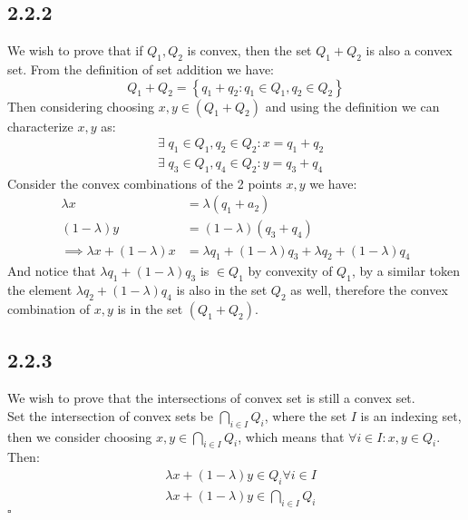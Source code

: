 \documentclass[]{article}
\begin{document}
    \subsection*{2.2.2}
        We wish to prove that if $Q_1, Q_2$ is convex, then the set $Q_1 + Q_2$ is also a convex set. From the definition of set addition we have: 
        $$
            Q_1 + Q_2 = \left\lbrace
                q_1 + q_2: q_1 \in Q_1, q_2 \in Q_2
            \right\rbrace
        $$
        Then considering choosing $x, y \in (Q_1 + Q_2)$ and using the definition we can characterize $x, y$ as: 
        \begin{align*}\tag{2.2.2.1}\label{eqn:2.2.2.1}
            & \exists\; q_1 \in Q_1, q_2 \in Q_2 : x = q_1 + q_2
            \\
            & \exists\; q_3 \in Q_1, q_4 \in Q_2 : y = q_3 + q_4
        \end{align*}
        Consider the convex combinations of the 2 points $x, y$ we have: 
        \begin{align*}\tag{2.2.2.2}\label{eqn:2.2.2.2}
            \lambda x &= \lambda(q_1 + a_2)
            \\
            (1 - \lambda) y &= (1 - \lambda)(q_3 + q_4)
            \\\implies
            \lambda x + (1 - \lambda)x &= \lambda q_1 + (1 - \lambda)q_3 + 
            \lambda q_2 + (1 - \lambda)q_4
        \end{align*}
        And notice that $\lambda q_1 + (1 - \lambda)q_3$ is $\in Q_1$ by convexity of $Q_1$, by a similar token the element $\lambda q_2 + (1 - \lambda)q_4$ is also in the set $Q_2$ as well, therefore the convex combination of $x, y$ is in the set $(Q_1 + Q_2)$. 
    \subsection*{2.2.3}
        We wish to prove that the intersections of convex set is still a convex set. 
        \\[1.1em] 
        Set the intersection of convex sets be $\bigcap_{i \in I}Q_i$, where the set $I$ is an indexing set, then we consider choosing $x, y \in \bigcap_{i \in I}Q_i$, which means that $\forall i \in I: x, y \in Q_i$. Then: 
        \begin{align*}\tag{2.2.3.1}\label{eqn:2.2.3.1}
            & \lambda x + (1 - \lambda) y \in Q_i \forall i \in I
            \\
            & \lambda x + (1 - \lambda) y \in \bigcap_{i \in I}Q_i
        \end{align*}
        $\square$
\end{document}
